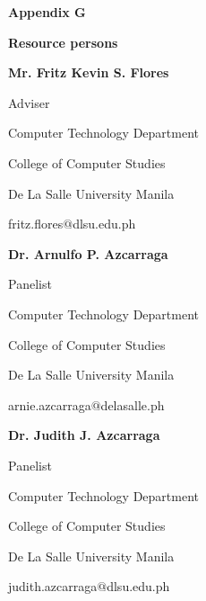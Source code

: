 %
%
%                 

\textbf{\Huge Appendix G}
\bigskip

\textbf{\LARGE Resource persons}

\bigskip
\textbf{Mr. Fritz Kevin S. Flores}

Adviser

Computer Technology Department

College of Computer Studies

{De La Salle University Manila}

fritz.flores$@$dlsu.edu.ph

\bigskip
\textbf{Dr. Arnulfo P. Azcarraga}

Panelist

Computer Technology Department

College of Computer Studies

{De La Salle University Manila}

arnie.azcarraga$@$delasalle.ph

\bigskip
\textbf{Dr. Judith J. Azcarraga}

Panelist

Computer Technology Department

College of Computer Studies

{De La Salle University Manila}

judith.azcarraga$@$dlsu.edu.ph

